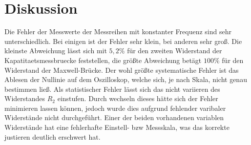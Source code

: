 \section{Diskussion}
\label{sec:Diskussion}
Die Fehler der Messwerte der Messreihen mit konstanter Frequenz sind sehr unterschiedlich.
Bei einigen ist der Fehler sehr klein, bei anderen sehr groß. Die kleinste Abweichung 
lässt sich mit $5,2\%$ für den zweiten Widerstand der Kapatitaetsmessbruecke feststellen,
die größte Abweichung betägt $100\%$ für den Widerstand der Maxwell-Brücke. Der wohl größte 
systematische Fehler ist das Ablesen der Nullinie auf dem Oszilloskop, welche sich, je nach Skala, 
nicht genau bestimmen ließ. Als statistischer Fehler lässt sich das nicht variieren des Widerstandes 
$R_2$ einstufen. Durch wechseln dieses hätte sich der Fehler minimieren lassen können, jedoch wurde dies
aufgrund fehlender varibaler Widerstände nicht durchgeführt. Einer der beiden vorhandenen variablen Widerstände
hat eine fehlerhafte Einstell- bzw Messskala, was das korrekte justieren deutlich erschwert hat.                                                                                             